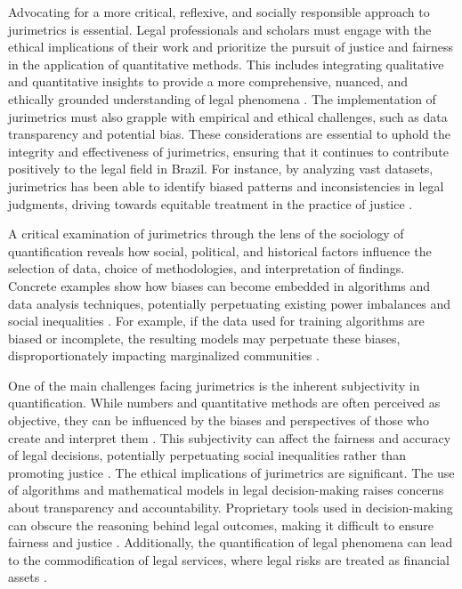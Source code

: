 Advocating for a more critical, reflexive, and socially responsible approach to jurimetrics is essential. Legal professionals and scholars must engage with the ethical implications of their work and prioritize the pursuit of justice and fairness in the application of quantitative methods. This includes integrating qualitative and quantitative insights to provide a more comprehensive, nuanced, and ethically grounded understanding of legal phenomena \cite{pereira2021}. The implementation of jurimetrics must also grapple with empirical and ethical challenges, such as data transparency and potential bias. These considerations are essential to uphold the integrity and effectiveness of jurimetrics, ensuring that it continues to contribute positively to the legal field in Brazil. For instance, by analyzing vast datasets, jurimetrics has been able to identify biased patterns and inconsistencies in legal judgments, driving towards equitable treatment in the practice of justice \cite{10.1007/s11186-021-09453-1,international2015}.

A critical examination of jurimetrics through the lens of the sociology of quantification reveals how social, political, and historical factors influence the selection of data, choice of methodologies, and interpretation of findings. Concrete examples show how biases can become embedded in algorithms and data analysis techniques, potentially perpetuating existing power imbalances and social inequalities \cite{10.1007/s11186-021-09453-1,international2015}. For example, if the data used for training algorithms are biased or incomplete, the resulting models may perpetuate these biases, disproportionately impacting marginalized communities \cite{10.5040/9781350220645,10.1080/07329113.2015.1046739}.

One of the main challenges facing jurimetrics is the inherent subjectivity in quantification. While numbers and quantitative methods are often perceived as objective, they can be influenced by the biases and perspectives of those who create and interpret them \cite{101111lsi12334}. This subjectivity can affect the fairness and accuracy of legal decisions, potentially perpetuating social inequalities rather than promoting justice \cite{101111lsi12334}. The ethical implications of jurimetrics are significant. The use of algorithms and mathematical models in legal decision-making raises concerns about transparency and accountability. Proprietary tools used in decision-making can obscure the reasoning behind legal outcomes, making it difficult to ensure fairness and justice \cite{101057s415990200396_5}. Additionally, the quantification of legal phenomena can lead to the commodification of legal services, where legal risks are treated as financial assets \cite{ribeiro2021quantification}.

